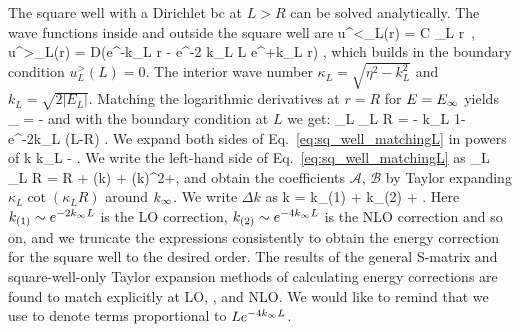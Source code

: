 	The square well with a Dirichlet bc at $L > R$ can be solved analytically.
	The wave functions inside and outside the square well are
	\beq
  u^<_L(r) = C \sin\kappa_L r \,,
  \qquad
  u^>_L(r) = D(e^{-k_L r} - e^{-2 k_L L} e^{+k_L r})
  \;,
	\eeq
	which builds in the boundary condition $u^>_L(L) = 0$.
	The interior wave number $ \kappa_L = \sqrt{\eta^2 - k_L^2}$ and
	$k_L = \sqrt{2 |E_L|}$.
	Matching the logarithmic derivatives at $r=R$ for $E=E_{\infty}$ yields
	\beq
	  \kappa_\infty {} = -\kinf
	\eeq
	and with the boundary condition at $L$ we get:
	\beq
	 \kappa_L \cot \kappa_L R = - k_L 
	 {1-e^{-2k_L (L-R)}} \;.
	 \label{eq:sq_well_matchingL}
	\eeq
	We expand both sides of Eq.~\eqref{eq:sq_well_matchingL} in powers of
	\beq
	  \Delta k \equiv k_L - \kinf\;.
	  \label{eq:Delta_k_def}
	\eeq
	We write the left-hand side of Eq.~\eqref{eq:sq_well_matchingL} as
	\beq
	\kappa_L \cot \kappa_L R = \kappainf \cot \kappainf R + 
	(\Delta k)  +  (\Delta k)^2+\cdots \;,
	\label{eq:LHS_matchingL_expansion}
	\eeq
	and obtain the coefficients $\mathcal{A}$, $\mathcal{B}$ by Taylor
	expanding $\kappa_L	\cot (\kappa_L R)$ around $k_{\infty}$.
	We write $\Delta k$ as
	\beq
	\label{eq:Delta_k_def2} \Delta k = k_{(1)} + k_{(2)} + \cdots \;.
	\eeq
	Here $k_{(1)} \sim e^{-2 k_{\infty} L}$ is the LO correction, $k_{(2)}
	\sim e^{-4k_{\infty} L}$ is the NLO correction and so on, and we truncate the
	expressions consistently to obtain the energy correction for the
	square well to the desired order.  The results of the general S-matrix
	and square-well-only Taylor expansion methods of calculating energy
	corrections are found to match explicitly at LO, \LNLO, and NLO.
	We would like to remind that we use \LNLO to denote terms proportional
	to $L e^{-4 k_{\infty} L}$.


